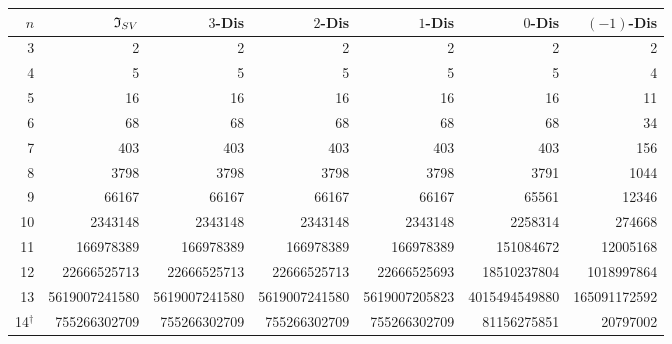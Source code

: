 \begin{tabular*}{\textwidth}{@{\extracolsep{\fill}}rrrrrrr@{}}
\toprule
$n$ & $\mathfrak I_{SV}$ & $3$-Dis & $2$-Dis & $1$-Dis & $0$-Dis & $(-1)$-Dis \\
\midrule
3 & \num{2} & \num{2} & \num{2} & \num{2} & \num{2} & \num{2} \\
4 & \num{5} & \num{5} & \num{5} & \num{5} & \num{5} & \num{4} \\
5 & \num{16} & \num{16} & \num{16} & \num{16} & \num{16} & \num{11} \\
6 & \num{68} & \num{68} & \num{68} & \num{68} & \num{68} & \num{34} \\
7 & \num{403} & \num{403} & \num{403} & \num{403} & \num{403} & \num{156} \\
8 & \num{3798} & \num{3798} & \num{3798} & \num{3798} & \num{3791} & \num{1044} \\
9 & \num{66167} & \num{66167} & \num{66167} & \num{66167} & \num{65561} & \num{12346} \\
10 & \num{2343148} & \num{2343148} & \num{2343148} & \num{2343148} & \num{2258314} & \num{274668} \\
11 & \num{166978389} & \num{166978389} & \num{166978389} & \num{166978389} & \num{151084672} & \num{12005168} \\
12 & \num{22666525713} & \num{22666525713} & \num{22666525713} & \num{22666525693} & \num{18510237804} & \num{1018997864} \\
13 & \num{5619007241580} & \num{5619007241580} & \num{5619007241580} & \num{5619007205823} & \num{4015494549880} & \num{165091172592} \\
14$^{\dagger}$ & \num{755266302709} & \num{755266302709} & \num{755266302709} & \num{755266302709} & \num{81156275851} & \num{20797002} \\
\bottomrule
\end{tabular*}
\endgroup
